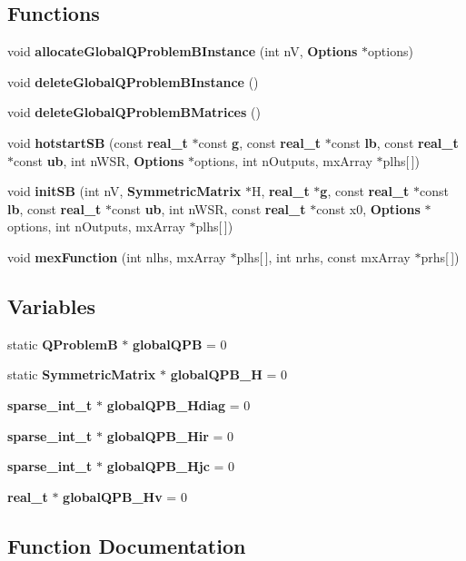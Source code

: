 \subsection*{Functions}
\begin{DoxyCompactItemize}
\item 
void {\bf allocateGlobalQProblemBInstance} (int nV, {\bf Options} $\ast$options)
\item 
void {\bf deleteGlobalQProblemBInstance} ()
\item 
void {\bf deleteGlobalQProblemBMatrices} ()
\item 
void {\bf hotstartSB} (const {\bf real\_\-t} $\ast$const {\bf g}, const {\bf real\_\-t} $\ast$const {\bf lb}, const {\bf real\_\-t} $\ast$const {\bf ub}, int nWSR, {\bf Options} $\ast$options, int nOutputs, mxArray $\ast$plhs[$\,$])
\item 
void {\bf initSB} (int nV, {\bf SymmetricMatrix} $\ast$H, {\bf real\_\-t} $\ast${\bf g}, const {\bf real\_\-t} $\ast$const {\bf lb}, const {\bf real\_\-t} $\ast$const {\bf ub}, int nWSR, const {\bf real\_\-t} $\ast$const x0, {\bf Options} $\ast$options, int nOutputs, mxArray $\ast$plhs[$\,$])
\item 
void {\bf mexFunction} (int nlhs, mxArray $\ast$plhs[$\,$], int nrhs, const mxArray $\ast$prhs[$\,$])
\end{DoxyCompactItemize}
\subsection*{Variables}
\begin{DoxyCompactItemize}
\item 
static {\bf QProblemB} $\ast$ {\bf globalQPB} = 0
\item 
static {\bf SymmetricMatrix} $\ast$ {\bf globalQPB\_\-H} = 0
\item 
{\bf sparse\_\-int\_\-t} $\ast$ {\bf globalQPB\_\-Hdiag} = 0
\item 
{\bf sparse\_\-int\_\-t} $\ast$ {\bf globalQPB\_\-Hir} = 0
\item 
{\bf sparse\_\-int\_\-t} $\ast$ {\bf globalQPB\_\-Hjc} = 0
\item 
{\bf real\_\-t} $\ast$ {\bf globalQPB\_\-Hv} = 0
\end{DoxyCompactItemize}


\subsection{Function Documentation}

